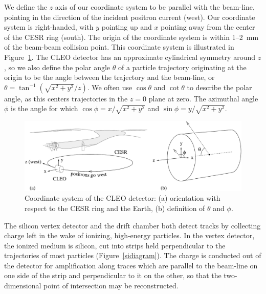 \documentclass{cornell}
\begin{document}
We define the $z$ axis of our coordinate system to be parallel with
the beam-line, pointing in the direction of the incident positron
current (west).  Our coordinate system is right-handed, with $y$
pointing up and $x$ pointing away from the center of the CESR ring
(south).  The origin of the coordinate system is within 1--2~mm of the
beam-beam collision point.  This coordinate system is illustrated in
Figure~\ref{coordinatesystem}.  The CLEO detector has an approximate
cylindrical symmetry around $z$, so we also define the polar angle
$\theta$ of a particle trajectory originating at the origin to be the
angle between the trajectory and the beam-line, or $\theta =
\tan^{-1}\left(\sqrt{x^2+y^2}/z\right)$.  We often use $\cos\theta$
and $\cot\theta$ to describe the polar angle, as this centers
trajectories in the $z=0$ plane at zero.  The azimuthal angle $\phi$
is the angle for which $\cos \phi = x/\sqrt{x^2+y^2}$ and $\sin \phi =
y/\sqrt{x^2+y^2}$.

\begin{figure}[p]
  \begin{center}
    \includegraphics[width=\linewidth]{plots/coordinatesystem}
  \end{center}
  \caption{\label{coordinatesystem} Coordinate system of the CLEO
  detector: (a) orientation with respect to the CESR ring and the
  Earth, (b) definition of $\theta$ and $\phi$.}
\end{figure}

The silicon vertex detector and the drift chamber both detect tracks
by collecting charge left in the wake of ionizing, high-energy
particles.  In the vertex detector, the ionized medium is silicon, cut
into strips held perpendicular to the trajectories of most particles
(Figure~\ref{sidiagram}).  The charge is conducted out of the detector
for amplification along traces which are parallel to the beam-line on
one side of the strip and perpendicular to it on the other, so that
the two-dimensional point of intersection may be reconstructed.
\end{document}
